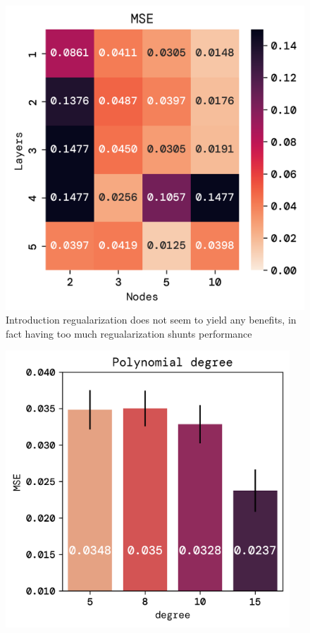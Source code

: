 \documentclass[twoside,11pt]{report}
\begin{document}
\begin{figure}[!ht]
\begin{minipage}[t]{0.5\textwidth - 1mm}
\begin{center}
                \includegraphics[width=\textwidth]{../runsAndFigures/MSE_layers_nodes.png}
            \end{center}
            \caption{Introduction regualarization does not seem to yield any benefits, in fact
            having too much regualarization shunts performance}\label{fig:accuracy_aplha}
        \end{minipage}
    \end{figure}


    \begin{figure}
        \begin{center}
            \includegraphics[width=0.95\textwidth]{../runsAndFigures/MSE_degree.png}
        \end{center}
        \caption{}\label{fig:}
    \end{figure}
\end{document}
